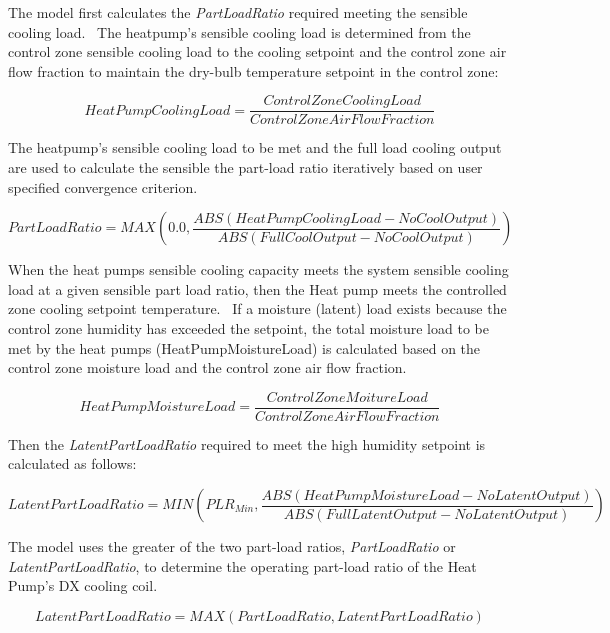 The model first calculates the \emph{PartLoadRatio} required meeting the sensible cooling load.~ The heatpump's sensible cooling load is determined from the control zone sensible cooling load to the cooling setpoint and the control zone air flow fraction to maintain the dry-bulb temperature setpoint in the control zone:

\begin{equation}
HeatPumpCoolingLoad = \frac{{ControlZoneCoolingLoad}}{{ControlZoneAirFlowFraction}}
\end{equation}

The heatpump's sensible cooling load to be met and the full load cooling output are used to calculate the sensible the part-load ratio iteratively based on user specified convergence criterion.

\begin{equation}
PartLoadRatio = MAX\left( {0.0,\frac{{ABS\left( {HeatPumpCoolingLoad - NoCoolOutput} \right)}}{{ABS\left( {FullCoolOutput - NoCoolOutput} \right)}}} \right)
\end{equation}

When the heat pumps sensible cooling capacity meets the system sensible cooling load at a given sensible part load ratio, then the Heat pump meets the controlled zone cooling setpoint temperature.~ If a moisture (latent) load exists because the control zone humidity has exceeded the setpoint, the total moisture load to be met by the heat pumps (HeatPumpMoistureLoad) is calculated based on the control zone moisture load and the control zone air flow fraction.

\begin{equation}
HeatPumpMoistureLoad = \frac{{ControlZoneMoitureLoad}}{{ControlZoneAirFlowFraction}}
\end{equation}

Then the \emph{LatentPartLoadRatio} required to meet the high humidity setpoint is calculated as follows:

\begin{equation}
LatentPartLoadRatio = MIN\left( {PL{R_{Min}},\frac{{ABS\left( {HeatPumpMoistureLoad - NoLatentOutput} \right)}}{{ABS\left( {FullLatentOutput - NoLatentOutput} \right)}}} \right)
\end{equation}

The model uses the greater of the two part-load ratios, \emph{PartLoadRatio} or \emph{LatentPartLoadRatio}, to determine the operating part-load ratio of the Heat Pump's DX cooling coil.

\begin{equation}
LatentPartLoadRatio = MAX\left( {PartLoadRatio,LatentPartLoadRatio} \right)
\end{equation}

